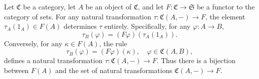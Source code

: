 Let $\mathfrak{C}$ be a category, let $A$ be an object of $\mathfrak{C}$, and let $F: \mathfrak{C} \to \mathfrak{S}$ be a functor to the category of sets. For any natural transformation $\tau: \mathfrak{C}(A, -) \to F$, the element $\tau_A(1_A) \in F(A)$ determines $\tau$ entirely. Specifically, for any $\varphi: A \to B$,
$$\tau_B(\varphi) = (F\varphi)(\tau_A(1_A)).$$
Conversely, for any $\kappa \in F(A)$, the rule
$$\tau_B(\varphi) = (F\varphi)(\kappa), \quad \varphi \in \mathfrak{C}(A, B),$$
defines a natural transformation $\tau: \mathfrak{C}(A, -) \to F$. Thus there is a bijection between $F(A)$ and the set of natural transformations $\mathfrak{C}(A, -) \to F$.
